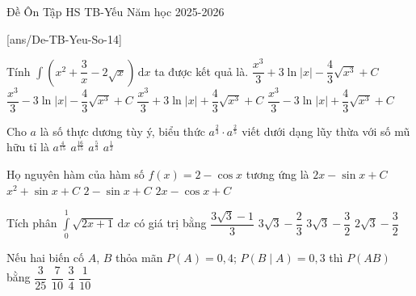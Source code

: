 \begin{name}
{Đề Ôn Tập HS TB-Yếu}
{Năm học 2025-2026}
\end{name}

[ans/De-TB-Yeu-So-14]
\TN
\begin{ex}%
	Tính $\displaystyle\int \left(x^2+\dfrac{3}{x}-2\sqrt{x}\right)\mathrm{\,d}x$ ta được kết quả là.
	\choice
	{\True $\dfrac{x^3}{3}+3\ln |x|-\dfrac{4}{3}\sqrt{x^3}+C$}
	{$\dfrac{x^3}{3}-3\ln |x|-\dfrac{4}{3}\sqrt{x^3}+C$}
	{$\dfrac{x^3}{3}+3\ln |x|+\dfrac{4}{3}\sqrt{x^3}+C$}
	{$\dfrac{x^3}{3}-3\ln |x|+\dfrac{4}{3}\sqrt{x^3}+C$}
\end{ex}

\begin{ex}%
	Cho $a$ là số thực dương tùy ý, biểu thức $a^{\tfrac{2}{3}}\cdot a^{\tfrac{2}{5}}$ viết dưới dạng lũy thừa với số mũ hữu tỉ là
	\choice
	{$a^{\tfrac{4}{15}}$}
	{\True $a^{\tfrac{16}{15}}$}
	{$a^{\tfrac{5}{3}}$}
	{$a^{\tfrac{1}{2}}$}
\end{ex}

\begin{ex}%
	Họ nguyên hàm của hàm số $f(x)=2-\cos x$ tương ứng là
	\choice
	{\True $2x-\sin x+C$}
	{$x^2+\sin x+C$}
	{$2-\sin x+C$}
	{$2x-\cos x+C$}
\end{ex}

\begin{ex}%
	Tích phân $\displaystyle\int \limits_0^1\sqrt{2x+1}\mathrm{\,d}x$ có giá trị bằng
	\choice
	{\True $\dfrac{3\sqrt{3}-1}{3}$}
	{$3\sqrt{3}-\dfrac{2}{3}$}
	{$3\sqrt{3}-\dfrac{3}{2}$}
	{$2\sqrt{3}-\dfrac{3}{2}$}
\end{ex}

\begin{ex}%
	Nếu hai biến cố $A$, $B$ thỏa mãn $P(A)=0{,}4$; $P(B\mid A)=0{,}3$ thì $P(AB)$ bằng
	\choice
	{\True $\dfrac{3}{25}$}
	{$\dfrac{7}{10}$}
	{$\dfrac{3}{4}$}
	{$\dfrac{1}{10}$}
\end{ex}

